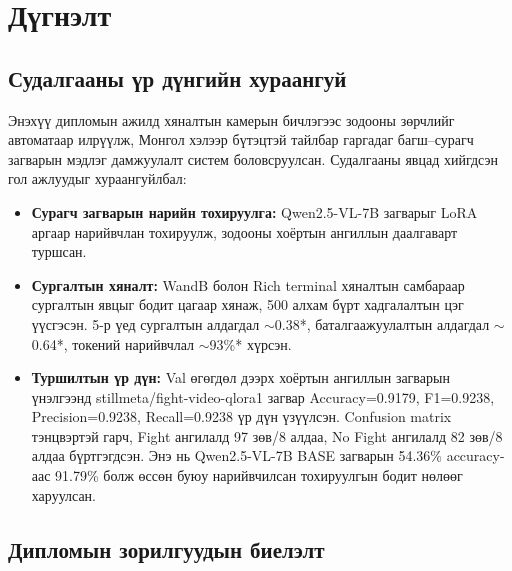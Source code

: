 \chapter{Дүгнэлт}

\section{Судалгааны үр дүнгийн хураангуй}

Энэхүү дипломын ажилд хяналтын камерын бичлэгээс зодооны зөрчлийг автоматаар илрүүлж, Монгол хэлээр бүтэцтэй тайлбар гаргадаг багш--сурагч загварын мэдлэг дамжуулалт систем боловсруулсан. Судалгааны явцад хийгдсэн гол ажлуудыг хураангуйлбал:

\begin{itemize}
    \item \textbf{Сурагч загварын нарийн тохируулга:} Qwen2.5-VL-7B загварыг LoRA аргаар нарийвчлан тохируулж, зодооны хоёртын ангиллын даалгаварт туршсан.

    \item \textbf{Сургалтын хяналт:} WandB болон Rich terminal хяналтын самбараар сургалтын явцыг бодит цагаар хянаж, 500 алхам бүрт хадгалалтын цэг үүсгэсэн. 5-р үед сургалтын алдагдал $\sim$0.38*, баталгаажуулалтын алдагдал $\sim$0.64*, токений нарийвчлал $\sim$93\%* хүрсэн.

    \item \textbf{Туршилтын үр дүн:} Val өгөгдөл дээрх хоёртын ангиллын загварын үнэлгээнд stillmeta/fight-video-qlora1 загвар Accuracy=0.9179, F1=0.9238, Precision=0.9238, Recall=0.9238 үр дүн үзүүлсэн. Confusion matrix тэнцвэртэй гарч, Fight ангилалд 97 зөв/8 алдаа, No Fight ангилалд 82 зөв/8 алдаа бүртгэгдсэн. Энэ нь Qwen2.5-VL-7B BASE загварын 54.36\% accuracy-аас 91.79\% болж өссөн буюу нарийвчилсан тохируулгын бодит нөлөөг харуулсан.

\end{itemize}

\section{Дипломын зорилгуудын биелэлт}

